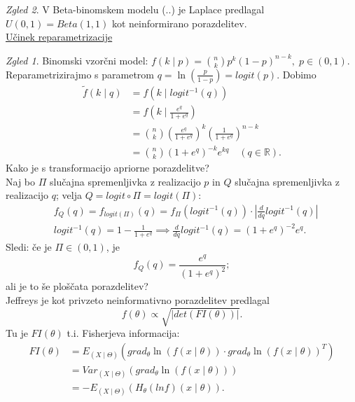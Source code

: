 \documentclass[a4paper, 12pt]{book}
\theoremstyle{definition}
\theoremstyle{remark}
\newtheorem*{exmp}{Zgled}
\newcommand{\R}{\mathbb{R}}
\begin{document}
\begin{exmp}
  V Beta-binomskem modelu (..) je Laplace predlagal $U(0,1) = Beta(1,1)$ kot neinformirano porazdelitev. \\
  \underline{Učinek reparametrizacije}
  \begin{exmp}
    Binomski vzorčni model: $f(k \mid p) = \binom{n}{k} p^k (1-p)^{n-k}, \; p \in (0,1)$. \\
    Reparametrizirajmo s parametrom $q = \ln\left(\frac{p}{1-p}\right) = logit(p)$.
    Dobimo
    \begin{align*}
      \widetilde{f}(k \mid q) &= f(k \mid logit^{-1}(q)) \\
      &= f\left(k \mid \frac{e^q}{1+e^q}\right) \\
      &= \binom{n}{k} \left(\frac{e^q}{1+e^q}\right)^k \left(\frac{1}{1+e^q}\right)^{n-k} \\
      &= \binom{n}{k} (1+e^q)^{-k} e^{kq} \quad (q \in \R).
    \end{align*}
    Kako je s transformacijo apriorne porazdelitve? \\
    Naj bo $\Pi$ slučajna spremenljivka z realizacijo $p$ in $Q$ slučajna spremenljivka z realizacijo $q$;
    velja $Q = logit \circ \Pi = logit(\Pi)$:
    \begin{align*}
      &f_Q(q) = f_{logit(\Pi)}(q) = f_{\Pi}(logit^{-1}(q)) \cdot \left|\frac{d}{dq} logit^{-1}(q)\right| \\
      &logit^{-1}(q) = 1 - \frac{1}{1+e^q} \implies \frac{d}{dq} logit^{-1}(q) = (1+e^q)^{-2} e^q.
    \end{align*}
    Sledi: če je $\Pi \in (0,1)$, je
    \begin{equation*}
      f_Q(q) = \frac{e^q}{(1+e^q)^2};
    \end{equation*}
    ali je to še ploščata porazdelitev? \\
    Jeffreys je kot privzeto neinformativno porazdelitev predlagal
    \begin{equation}
      \label{Jeffrey-neinformativna}
      f(\theta) \propto \sqrt{|det (FI(\theta))|}.
    \end{equation}
    Tu je $FI(\theta)$ t.i. Fisherjeva informacija:
    \begin{align*}
      FI(\theta) &= E_{(X \mid \Theta)} (grad_{\theta} \ln(f(x \mid \theta)) \cdot grad_{\theta} \ln(f(x \mid \theta))^T) \\
      &= Var_{(X \mid \Theta)} (grad_{\theta} \ln (f(x \mid \theta))) \\
      &= -E_{(X \mid \Theta)} (H_{\theta} (ln f) (x \mid \theta)).

\end{align*}
\end{exmp}
\end{exmp}
\end{document}
